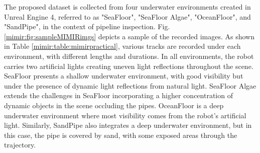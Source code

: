 The proposed dataset is collected from four underwater environments created in Unreal Engine 4, referred to as "SeaFloor", "SeaFloor Algae", "OceanFloor", and "SandPipe", in the context of pipeline inspection. Fig. \ref{mimir:fig:sampleMIMIRimgs} depicts a sample of the recorded images. As shown in Table \ref{mimir:table:mimirpractical}, various tracks are recorded under each environment, with different lengths and durations. 
In all environments, the robot carries two artificial lights creating uneven light reflections throughout the scene.
SeaFloor presents a shallow underwater environment, with good visibility but under the presence of dynamic light reflections from natural light. SeaFloor Algae extends the challenges in SeaFloor incorporating a higher concentration of dynamic objects in the scene occluding the pipes. %
OceanFloor is a deep underwater environment where most visibility comes from the robot's artificial light.
Similarly, SandPipe also integrates a deep underwater environment, but in this case, the pipe is covered by sand, with some exposed areas through the trajectory.

